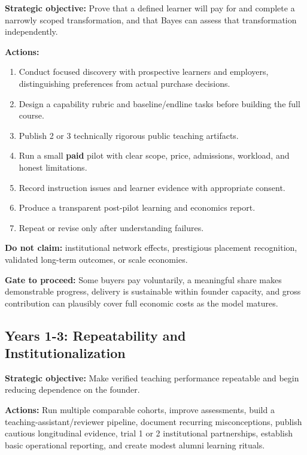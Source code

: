 \textbf{Strategic objective:} Prove that a defined learner will pay for and complete a narrowly scoped transformation, and that Bayes can assess that transformation independently.

\vspace{0.5em}
\noindent\textbf{Actions:}
\begin{enumerate}
    \item Conduct focused discovery with prospective learners and employers, distinguishing preferences from actual purchase decisions.
    \item Design a capability rubric and baseline/endline tasks before building the full course.
    \item Publish 2 or 3 technically rigorous public teaching artifacts.
    \item Run a small \textbf{paid} pilot with clear scope, price, admissions, workload, and honest limitations.
    \item Record instruction issues and learner evidence with appropriate consent.
    \item Produce a transparent post-pilot learning and economics report.
    \item Repeat or revise only after understanding failures.
\end{enumerate}

\noindent\textbf{Do not claim:} institutional network effects, prestigious placement recognition, validated long-term outcomes, or scale economies.

\vspace{0.5em}
\noindent\textbf{Gate to proceed:} Some buyers pay voluntarily, a meaningful share makes demonstrable progress, delivery is sustainable within founder capacity, and gross contribution can plausibly cover full economic costs as the model matures.

\subsection{Years 1-3: Repeatability and Institutionalization}
\label{sec:years_1_3_repeatability}

\textbf{Strategic objective:} Make verified teaching performance repeatable and begin reducing dependence on the founder.

\vspace{0.5em}
\noindent\textbf{Actions:} Run multiple comparable cohorts, improve assessments, build a teaching-assistant/reviewer pipeline, document recurring misconceptions, publish cautious longitudinal evidence, trial 1 or 2 institutional partnerships, establish basic operational reporting, and create modest alumni learning rituals.

